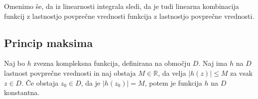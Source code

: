 \documentclass[mat1, tisk]{fmfdelo}
\begin{document}
    Omenimo še, da iz linearnosti integrala sledi, da je tudi linearna kombinacija funkcij z lastnostjo povprečne vrednosti funkcija z lastnostjo povprečne vrednosti. 

\subsection{Princip maksima}
    \begin{trditev}
        \label{pm_lpv}
        Naj bo $h$ zvezna kompleksna funkcija, definirana na območju $D$. Naj ima $h$ na $D$ lastnost povprečne vrednosti in naj obstaja $M \in \mathbb{R}$, da velja $|h(z)| \leq M$ za vsak $z \in D$. 
        Če obstaja $z_0 \in D$, da je $|h(z_0)| = M$, potem je funkcija $h$ na $D$ konstantna. 
    \end{trditev}
\end{document}
